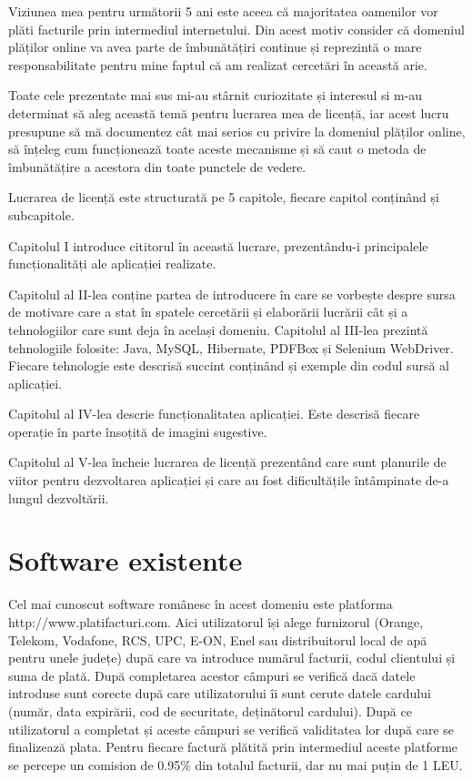 \documentclass[12pt]{book}
\begin{document}
Viziunea mea pentru următorii 5 ani este aceea că majoritatea oamenilor vor plăti facturile prin intermediul internetului. Din acest motiv consider că domeniul plăților online va avea parte de îmbunătățiri continue și reprezintă o mare responsabilitate pentru mine faptul că am realizat cercetări în această arie.

Toate cele prezentate mai sus mi-au stârnit curiozitate și interesul si m-au determinat să aleg această temă pentru lucrarea mea de licență, iar acest lucru presupune să mă documentez cât mai serios cu privire la domeniul plăților online, să înțeleg cum funcționează toate aceste mecanisme și să caut o metoda de îmbunătățire a acestora din toate punctele de vedere. 

Lucrarea de licență este structurată pe 5 capitole, fiecare capitol conținând și subcapitole.

Capitolul I introduce cititorul în această lucrare, prezentându-i principalele funcționalități ale aplicației realizate.

Capitolul al II-lea conține partea de introducere în care se vorbește despre sursa de motivare care a stat în spatele cercetării și elaborării lucrării cât și a tehnologiilor care sunt deja în același domeniu.
Capitolul al III-lea prezintă tehnologiile folosite: Java, MySQL, Hibernate, PDFBox și Selenium WebDriver. Fiecare tehnologie este descrisă succint conținând și exemple din codul sursă al aplicației.

Capitolul al IV-lea descrie funcționalitatea aplicației. Este descrisă fiecare operație în parte însoțită de imagini sugestive. 

Capitolul al V-lea încheie lucrarea de licență prezentând care sunt planurile de viitor pentru dezvoltarea aplicației și care au fost dificultățile întâmpinate de-a lungul dezvoltării.


\section{Software existente}

Cel mai cunoscut software românesc în acest domeniu este platforma http://www.platifacturi.com. Aici utilizatorul își alege furnizorul (Orange, Telekom, Vodafone, RCS, UPC, E-ON, Enel sau distribuitorul local de apă pentru unele județe) după care va introduce numărul facturii, codul clientului și suma de plată. După completarea acestor câmpuri se verifică dacă datele introduse sunt corecte după care utilizatorului îi sunt cerute datele cardului (număr, data expirării, cod de securitate, deținătorul cardului). După ce utilizatorul a completat și aceste câmpuri se verifică validitatea lor după care se finalizează plata. Pentru fiecare factură plătită prin intermediul aceste platforme se percepe un comision de 0.95\% din totalul facturii, dar nu mai puțin de 1 LEU. \cite{PlatiFacturi}
\end{document}
